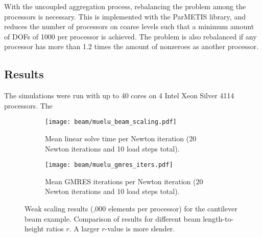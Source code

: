 With the uncoupled aggregation process, rebalancing the problem among the processors is necessary. This is implemented with the ParMETIS library, and reduces the number of processors on coarse levels such that a minimum amount of DOFs of 1000 per processor is achieved. The problem is also rebalanced if any processor has more than 1.2 times the amount of nonzeroes as another processor.

\subsection{Results}
The simulations were run with up to 40 cores on 4 Intel Xeon Silver 4114 processors. The



\begin{figure}[ht]
\begin{subfigure}{\columnwidth}
    \centering
    \texttt{[image: beam/muelu\_beam\_scaling.pdf]}
    \caption{Mean linear solve time per Newton iteration (20 Newton iterations and 10 load steps total).}
    \label{fig:3}
\end{subfigure}
\begin{subfigure}{\columnwidth}
    \centering
    \texttt{[image: beam/muelu\_gmres\_iters.pdf]}
    \caption{Mean GMRES iterations per Newton iteration (20 Newton iterations and 10 load steps total).}
    \label{fig:4}
\end{subfigure}
\caption{Weak scaling results (,000 elements per processor) for the cantilever beam example. Comparison of results for different beam length-to-height ratios $r$. A larger $r$-value is more slender.}
\end{figure}

